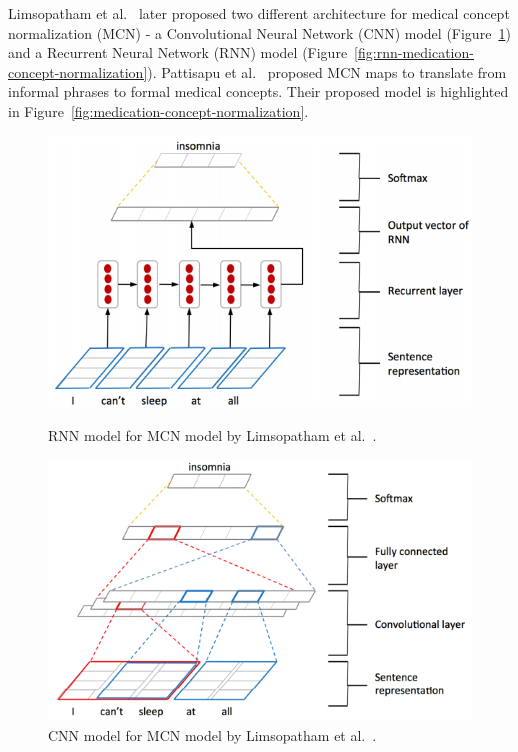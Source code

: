 Limsopatham et al.~\cite{limsopatham2016normalising} later proposed two different architecture for medical concept normalization (MCN) - a Convolutional Neural Network (CNN) model (Figure~\ref{fig:cnn-medication-concept-normalization}) and a Recurrent Neural Network (RNN) model (Figure~\ref{fig:rnn-medication-concept-normalization}). Pattisapu et al.~\cite{PATTISAPU2020103522} proposed MCN  maps to translate from informal phrases to formal medical concepts. Their proposed model is highlighted in Figure~\ref{fig:medication-concept-normalization}.


\begin{figure}[h]
	\centering
	\begin{minipage}{0.45\textwidth}
		\includegraphics[width=0.99\linewidth]{Figures/q.png}
		\caption{RNN model for MCN model by Limsopatham et al.~\cite{limsopatham2016normalising}.}
		\label{fig:rnn-medication-concept-normalization}
	\end{minipage}
	\hfill
	\begin{minipage}{0.45\textwidth}
		\includegraphics[width=0.99\linewidth]{Figures/p.png}
		\caption{CNN model for MCN model by Limsopatham et al.~\cite{limsopatham2016normalising}.}
		\label{fig:cnn-medication-concept-normalization}
	\end{minipage}
\end{figure}
